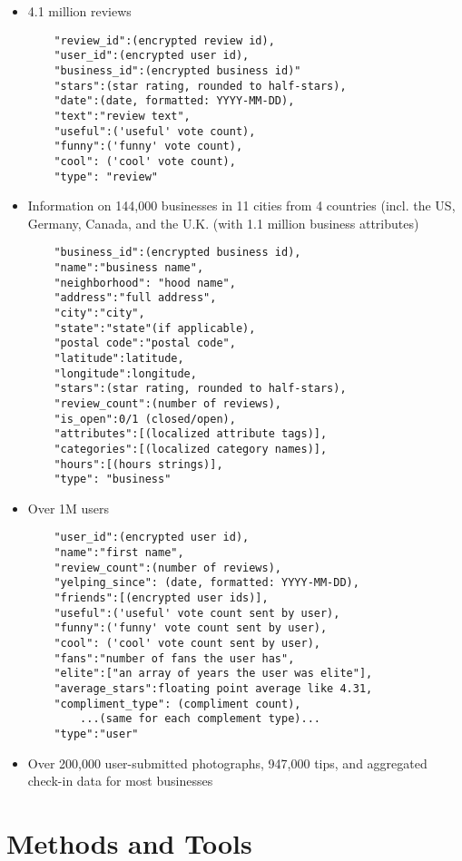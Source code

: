 \begin{itemize}
	\item{4.1 million reviews}
	\begin{verbatim}
	"review_id":(encrypted review id),
	"user_id":(encrypted user id),
	"business_id":(encrypted business id)"
	"stars":(star rating, rounded to half-stars),
	"date":(date, formatted: YYYY-MM-DD),
	"text":"review text",
	"useful":('useful' vote count),
	"funny":('funny' vote count),
	"cool": ('cool' vote count),
	"type": "review"
	\end{verbatim}
	\item{Information on 144,000 businesses in 11 cities from 4 countries (incl. the US, Germany, Canada, and the U.K. (with 1.1 million business attributes)}
	\begin{verbatim}
	"business_id":(encrypted business id),
	"name":"business name",
	"neighborhood": "hood name",
	"address":"full address",
	"city":"city",
	"state":"state"(if applicable),
	"postal code":"postal code",
	"latitude":latitude,
	"longitude":longitude,
	"stars":(star rating, rounded to half-stars),
	"review_count":(number of reviews),
	"is_open":0/1 (closed/open),
	"attributes":[(localized attribute tags)],
	"categories":[(localized category names)],
	"hours":[(hours strings)],
	"type": "business"
	\end{verbatim}
	\item{Over 1M users}
	\begin{verbatim}
	"user_id":(encrypted user id),
	"name":"first name",
	"review_count":(number of reviews),
	"yelping_since": (date, formatted: YYYY-MM-DD),
	"friends":[(encrypted user ids)],
	"useful":('useful' vote count sent by user),
	"funny":('funny' vote count sent by user),
	"cool": ('cool' vote count sent by user),
	"fans":"number of fans the user has",
	"elite":["an array of years the user was elite"],
	"average_stars":floating point average like 4.31,
	"compliment_type": (compliment count),
		...(same for each complement type)...
	"type":"user"
	\end{verbatim}
	\item{Over 200,000 user-submitted photographs, 947,000 tips, and aggregated check-in data for most businesses}
\end{itemize}

\section{Methods and Tools}

